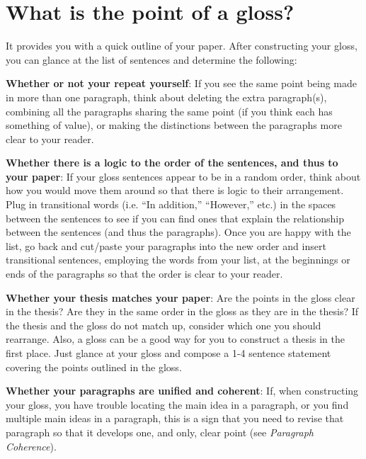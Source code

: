   	        
\section{What is the point of a gloss?}

It provides you with a quick outline of your paper. After constructing your gloss, you 
can glance at the list of sentences and determine the following:

        
\textbf{Whether or not your repeat yourself}: If you see the same point being made in 
more than one paragraph, think about deleting the extra paragraph(s), 
combining all the paragraphs sharing the same point (if you think each has 
something of value), or making the distinctions between the paragraphs more 
clear to your reader.
        
\textbf{Whether there is a logic to the order of the sentences, and thus to your paper}:
If your gloss sentences appear to be in a random order, think about how you would 
move them around so that there is logic to their arrangement.  Plug in transitional 
words (i.e. “In addition,” “However,” etc.)  in the spaces between the sentences to 
see if you can find ones that explain the relationship between the sentences (and thus 
the paragraphs). Once you are happy with the list, go back and cut/paste your 
paragraphs into the new order and insert transitional sentences, employing the words 
from your list, at the beginnings or ends of the paragraphs so that the order is clear to 
your reader.

\textbf{Whether your thesis matches your paper}: Are the points in the gloss clear in 
the thesis? Are they in the same order in the gloss as they are in the thesis? If the 
thesis and the gloss do not match up, consider which one you should rearrange. Also, a 
gloss can be a good way for you to construct a thesis in the first place. Just glance at 
your gloss and compose a 1-4 sentence statement covering the points outlined in the 
gloss.

\textbf{Whether your paragraphs are unified and coherent}: If, when constructing your 
gloss, you have trouble locating the main idea in a paragraph, or you find multiple main 
ideas in a paragraph, this is a sign that you need to revise that paragraph so that it 
develops one, and only, clear point (see \emph{Paragraph Coherence}).



